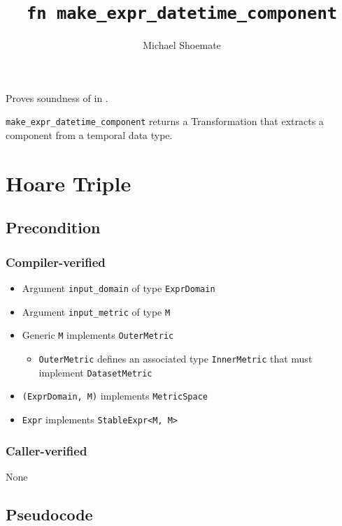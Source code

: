 \documentclass{article}
\title{\texttt{fn make\_expr\_datetime\_component}}
\author{Michael Shoemate}
\date{}
\begin{document}
\maketitle

\contrib
Proves soundness of  in .

\texttt{make\_expr\_datetime\_component} returns a Transformation that extracts a component from a temporal data type.

\section{Hoare Triple}
\subsection*{Precondition}
\subsubsection*{Compiler-verified}
\begin{itemize}
    \item Argument \texttt{input\_domain} of type \texttt{ExprDomain}
    \item Argument \texttt{input\_metric} of type \texttt{M}
    \item Generic \texttt{M} implements \texttt{OuterMetric}
    \begin{itemize}
        \item \texttt{OuterMetric} defines an associated type \texttt{InnerMetric} that must implement \texttt{DatasetMetric}
    \end{itemize}
    \item \texttt{(ExprDomain, M)} implements \texttt{MetricSpace}
    \item \texttt{Expr} implements \texttt{StableExpr<M, M>}
\end{itemize}

\subsubsection*{Caller-verified}
None

\subsection*{Pseudocode}

\end{document}
